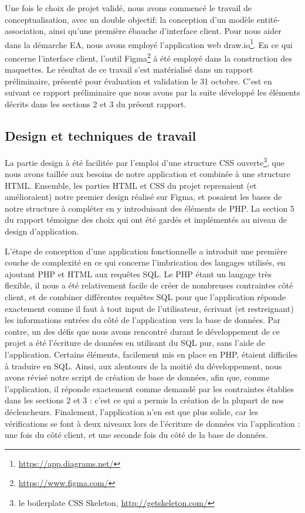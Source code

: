 \documentclass[a4paper,12pt]{article}
\begin{document}
Une fois le choix de projet validé, nous avons commencé le travail de conceptualisation, avec un double objectif: la conception d'un modèle entité-association, ainsi qu'une première ébauche d'interface client.
Pour nous aider dans la démarche EA, nous avons employé l'application web draw.io\footnote{\url{https://app.diagrams.net/}}.
En ce qui concerne l'interface client, l'outil Figma\footnote{\url{https://www.figma.com/}} à été employé dans la construction des maquettes.
Le résultat de ce travail s'est matérialisé dans un rapport préliminaire, présenté pour évaluation et validation le 31 octobre.
C'est en suivant ce rapport préliminaire que nous avons par la suite développé les éléments décrits dans les sections 2 et 3 du présent rapport.
 
\subsection{Design et techniques de travail }

La partie design à été facilitée par l'emploi d'une structure CSS ouverte\footnote{le boilerplate CSS Skeleton, \url{http://getskeleton.com/}}, que nous avons taillée aux besoins de notre application et combinée à une structure HTML.
Ensemble, les parties HTML et CSS du projet reprenaient (et amélioraient) notre premier design réalisé sur Figma, et posaient les bases de notre structure à compléter en y introduisant des éléments de PHP.
La section 5 du rapport témoigne des choix qui ont été gardés et implémentés au niveau de design d'application.

L'étape de conception d'une application fonctionnelle a introduit une première couche de complexité en ce qui concerne l'imbrication des langages utilisés, en ajoutant PHP et HTML aux requêtes SQL.
Le PHP étant un langage très flexible, il nous a été relativement facile de créer de nombreuses contraintes côté client, et de combiner différentes requêtes SQL pour que l'application réponde exactement comme il faut à tout input de l'utilisateur, écrivant (et restreignant) les informations entrées du côté de l'application vers la base de données. 
Par contre, un des défis que nous avons rencontré durant le développement de ce projet a été l'écriture de données en utilisant du SQL pur, sans l'aide de l'application.
Certains éléments, facilement mis en place en PHP, étaient difficiles à traduire en SQL.
Ainsi, aux alentours de la moitié du développement, nous avons révisé notre script de création de base de données, afin que, comme l'application, il réponde exactement comme demandé par les contraintes établies dans les sections 2 et 3 : c'est ce qui a permis la création de la plupart de nos déclencheurs.
Finalement, l'application n'en est que plus solide, car les vérifications se font à deux niveaux lors de l'écriture de données via l'application : une fois du côté client, et une seconde fois du côté de la base de données.
\end{document}
